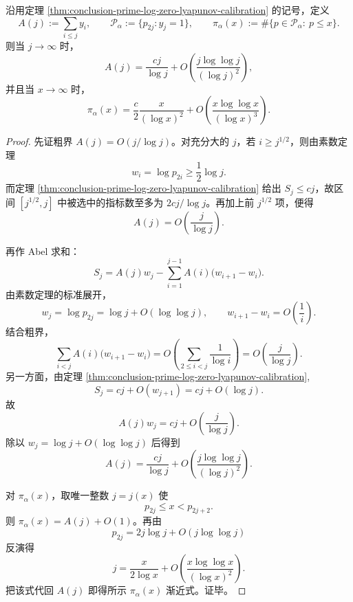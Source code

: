 \begin{theorem}\label{thm:conclusion-prime-log-sparse-prime-law}
沿用定理 \ref{thm:conclusion-prime-log-zero-lyapunov-calibration} 的记号，定义
\[
A(j):=\sum_{i\le j}y_i,
\qquad
\mathcal P_\alpha:=\{p_{2j}:y_j=1\},
\qquad
\pi_\alpha(x):=\#\{p\in\mathcal P_\alpha:\ p\le x\}.
\]
则当 \(j\to\infty\) 时，
\[
A(j)=\frac{cj}{\log j}+O\!\left(\frac{j\log\log j}{(\log j)^2}\right),
\]
并且当 \(x\to\infty\) 时，
\[
\pi_\alpha(x)=\frac{c}{2}\frac{x}{(\log x)^2}
+O\!\left(\frac{x\log\log x}{(\log x)^3}\right).
\]
\end{theorem}
\begin{proof}
先证粗界 \(A(j)=O(j/\log j)\)。对充分大的 \(j\)，若 \(i\ge j^{1/2}\)，则由素数定理
\[
w_i=\log p_{2i}\ge \frac12\log j.
\]
而定理 \ref{thm:conclusion-prime-log-zero-lyapunov-calibration} 给出 \(S_j\le cj\)，故区间 \([j^{1/2},j]\) 中被选中的指标数至多为 \(2cj/\log j\)。再加上前 \(j^{1/2}\) 项，便得
\[
A(j)=O\!\left(\frac{j}{\log j}\right).
\]

再作 Abel 求和：
\[
S_j=A(j)w_j-\sum_{i=1}^{j-1}A(i)\bigl(w_{i+1}-w_i\bigr).
\]
由素数定理的标准展开，
\[
w_j=\log p_{2j}=\log j+O(\log\log j),
\qquad
w_{i+1}-w_i=O\!\left(\frac1i\right).
\]
结合粗界，
\[
\sum_{i<j}A(i)\bigl(w_{i+1}-w_i\bigr)
=
O\!\left(\sum_{2\le i<j}\frac{1}{\log i}\right)
=
O\!\left(\frac{j}{\log j}\right).
\]
另一方面，由定理 \ref{thm:conclusion-prime-log-zero-lyapunov-calibration},
\[
S_j=cj+O(w_{j+1})=cj+O(\log j).
\]
故
\[
A(j)w_j=cj+O\!\left(\frac{j}{\log j}\right).
\]
除以
\(
w_j=\log j+O(\log\log j)
\)
后得到
\[
A(j)=\frac{cj}{\log j}
+O\!\left(\frac{j\log\log j}{(\log j)^2}\right).
\]

对 \(\pi_\alpha(x)\)，取唯一整数 \(j=j(x)\) 使
\[
p_{2j}\le x<p_{2j+2}.
\]
则 \(\pi_\alpha(x)=A(j)+O(1)\)。再由
\[
p_{2j}=2j\log j+O(j\log\log j)
\]
反演得
\[
j=\frac{x}{2\log x}
+O\!\left(\frac{x\log\log x}{(\log x)^2}\right).
\]
把该式代回 \(A(j)\) 即得所示 \(\pi_\alpha(x)\) 渐近式。证毕。
\end{proof}

